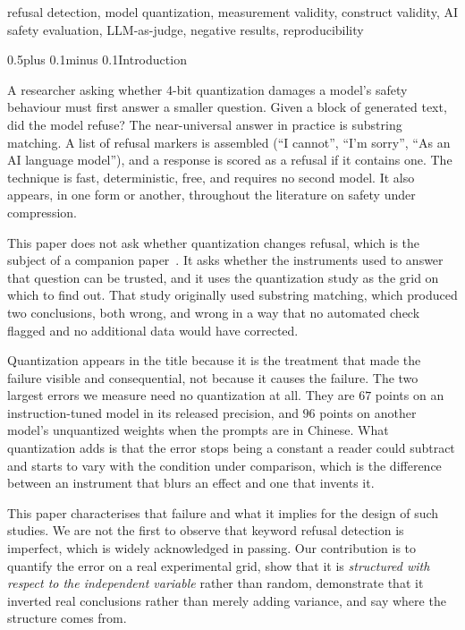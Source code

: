 \documentclass[conference,compsoc,letterpaper]{IEEEtran}
\makeatletter
\def\section{\@startsection{section}{1}{\z@}{1\baselineskip plus 0.25\baselineskip minus 0.25\baselineskip}%
{0.5\baselineskip plus 0.1\baselineskip minus 0.1\baselineskip}{\normalfont\large\bfseries}}%
\makeatother
\begin{document}
\begin{IEEEkeywords} refusal detection, model quantization, measurement validity, construct validity, AI safety evaluation, LLM-as-judge, negative results, reproducibility \end{IEEEkeywords}

\section{Introduction} \label{sec:intro}

A researcher asking whether 4-bit quantization damages a model's safety behaviour must first answer a smaller question. Given a block of generated text, did the model refuse? The near-universal answer in practice is substring matching. A list of refusal markers is assembled (``I cannot'', ``I'm sorry'', ``As an AI language model''), and a response is scored as a refusal if it contains one. The technique is fast, deterministic, free, and requires no second model. It also appears, in one form or another, throughout the literature on safety under compression.

This paper does not ask whether quantization changes refusal, which is the subject of a companion paper~\cite{kim2026quantization}. It asks whether the instruments used to answer that question can be trusted, and it uses the quantization study as the grid on which to find out. That study originally used substring matching, which produced two conclusions, both wrong, and wrong in a way that no automated check flagged and no additional data would have corrected.

Quantization appears in the title because it is the treatment that made the failure visible and consequential, not because it causes the failure. The two largest errors we measure need no quantization at all. They are $67$ points on an instruction-tuned model in its released precision, and $96$ points on another model's unquantized weights when the prompts are in Chinese. What quantization adds is that the error stops being a constant a reader could subtract and starts to vary with the condition under comparison, which is the difference between an instrument that blurs an effect and one that invents it.

This paper characterises that failure and what it implies for the design of such studies. We are not the first to observe that keyword refusal detection is imperfect, which is widely acknowledged in passing. Our contribution is to quantify the error on a real experimental grid, show that it is \emph{structured with respect to the independent variable} rather than random, demonstrate that it inverted real conclusions rather than merely adding variance, and say where the structure comes from.
\end{document}

